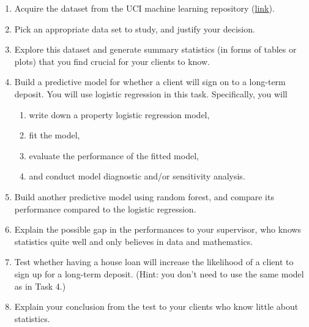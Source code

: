 \documentclass[12pt,]{book}
\providecommand{\tightlist}{%
  \setlength{\itemsep}{0pt}\setlength{\parskip}{0pt}}
\begin{document}
\begin{enumerate}
\def\labelenumi{\arabic{enumi}.}
\tightlist
\item
  Acquire the dataset from the UCI machine learning repository
  (\href{https://archive.ics.uci.edu/ml/datasets/Bank+Marketing\#}{link}).
\item
  Pick an appropriate data set to study, and justify your decision.
\item
  Explore this dataset and generate summary statistics (in forms of
  tables or plots) that you find crucial for your clients to know.
\item
  Build a predictive model for whether a client will sign on to a
  long-term deposit. You will use logistic regression in this task.
  Specifically, you will

  \begin{enumerate}
  \def\labelenumii{\alph{enumii}.}
  \tightlist
  \item
    write down a property logistic regression model,
  \item
    fit the model,
  \item
    evaluate the performance of the fitted model,
  \item
    and conduct model diagnostic and/or sensitivity analysis.
  \end{enumerate}
\item
  Build another predictive model using random forest, and compare its
  performance compared to the logistic regression.
\item
  Explain the possible gap in the performances to your supervisor, who
  knows statistics quite well and only believes in data and
  mathematics.\\
\item
  Test whether having a house loan will increase the likelihood of a
  client to sign up for a long-term deposit. (Hint: you don't need to
  use the same model as in Task 4.)
\item
  Explain your conclusion from the test to your clients who know little
  about statistics.
\end{enumerate}


\end{document}

